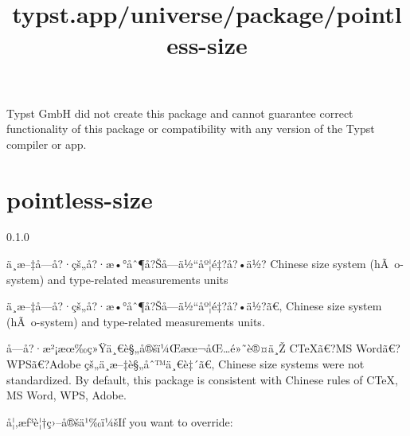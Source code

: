 Typst GmbH did not create this package and cannot guarantee correct
functionality of this package or compatibility with any version of the
Typst compiler or app.


\title{typst.app/universe/package/pointless-size}

\label{banner}
\section{pointless-size}\label{pointless-size}

{ 0.1.0 }

ä¸­æ--‡å­---å?·çš„å?·æ•°åˆ¶å?Šå­---ä½``åº¦é‡?å?•ä½? Chinese size system
(hÃ~o-system) and type-related measurements units

\label{readme}
ä¸­æ--‡å­---å?·çš„å?·æ•°åˆ¶å?Šå­---ä½``åº¦é‡?å?•ä½?ã€‚ Chinese size system
(hÃ~o-system) and type-related measurements units.

\begin{Shaded}
\begin{Highlighting}[]


\end{Highlighting}
\end{Shaded}

å­---å?·æ²¡æœ‰ç»Ÿä¸€è§„å®šï¼Œæœ¬åŒ\ldots é»˜è®¤ä¸Ž CTeXã€?MS
Wordã€?WPSã€?Adobe çš„ä¸­æ--‡è§„åˆ™ä¸€è‡´ã€‚ Chinese size systems were
not standardized. By default, this package is consistent with Chinese
rules of CTeX, MS Word, WPS, Adobe.

å¦‚æƒ³è¦†ç›--å®šä¹‰ï¼šIf you want to override:

\begin{Shaded}
\begin{Highlighting}[]


\end{Highlighting}
\end{Shaded}

